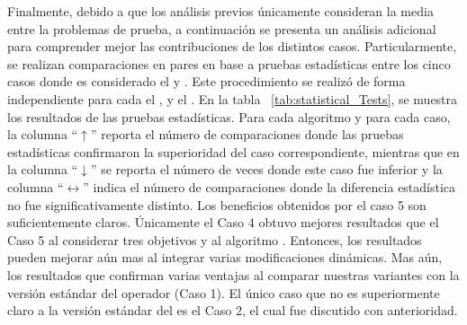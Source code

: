 Finalmente, debido a que los análisis previos únicamente consideran la media entre la problemas de prueba, a continuación se presenta un análisis adicional para comprender mejor las contribuciones de los distintos casos.
%
Particularmente, se realizan comparaciones en pares en base a pruebas estadísticas entre los cinco casos donde es considerado el \SBX{} y \DSBX{}.
%
Este procedimiento se realizó de forma independiente para cada el \NSGAII{}, \MOEAD{} y el \SMSEMOA{}.
%
En la tabla ~\ref{tab:statistical_Tests}, se muestra los resultados de las pruebas estadísticas.
%
Para cada algoritmo y para cada caso, la columna ``$\uparrow$'' reporta el número de comparaciones donde las pruebas estadísticas confirmaron la superioridad del caso correspondiente, mientras que en la columna ``$\downarrow$'' se reporta el número de veces donde este caso fue inferior y la columna ``$\longleftrightarrow$'' indica el número de comparaciones donde la diferencia estadística no fue significativamente distinto.
Los beneficios obtenidos por el caso 5 son suficientemente claros.
%
Únicamente el Caso 4 obtuvo mejores resultados que el Caso 5 al considerar tres objetivos y al algoritmo \NSGAII{}.
%
Entonces, los resultados pueden mejorar aún mas al integrar varias modificaciones dinámicas.
%
Mas aún, los resultados que confirman varias ventajas al comparar nuestras variantes con la versión estándar del operador \SBX{} (Caso 1).
%
El único caso que no es superiormente claro a la versión estándar del \SBX{} es el Caso 2, el cual fue discutido con anterioridad.
%


